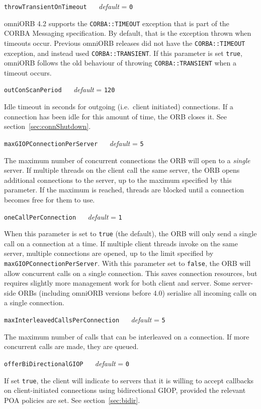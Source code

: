 \documentclass[11pt,twoside,a4paper]{book}
\makeatletter
\newcommand{\code}[1]{\texttt{#1}}
\newcommand{\confopt}[2]
  {\vspace{\baselineskip}\par\noindent\code{#1} ~~ \textit{default} =
   \code{#2}}
\renewcommand{\confopt}[2]
  {\vspace{\baselineskip}\par\noindent\code{#1} ~~ \textit{default} =
   \code{#2}\\[-1ex]\@afterheading}
\newcommand{\dsc}{\discretionary{}{}{}}
\makeatother
\begin{document}
\confopt{throwTransientOnTimeout}{0}

omniORB 4.2 supports the \code{CORBA::TIMEOUT} exception that is part
of the CORBA Messaging specification. By default, that is the
exception thrown when timeouts occur. Previous omniORB releases did
not have the \code{CORBA::TIMEOUT} exception, and instead used
\code{CORBA::TRANSIENT}. If this parameter is set \code{true}, omniORB
follows the old behaviour of throwing \code{CORBA::TRANSIENT} when a
timeout occurs.


\confopt{outConScanPeriod}{120}

Idle timeout in seconds for outgoing (i.e.\ client initiated)
connections. If a connection has been idle for this amount of time,
the ORB closes it. See section~\ref{sec:connShutdown}.


\confopt{maxGIOPConnectionPerServer}{5}

The maximum number of concurrent connections the ORB will open to a
\emph{single} server. If multiple threads on the client call the same
server, the ORB opens additional connections to the server, up to the
maximum specified by this parameter. If the maximum is reached,
threads are blocked until a connection becomes free for them to use.


\confopt{oneCallPerConnection}{1}

When this parameter is set to \code{true} (the default), the ORB will
only send a single call on a connection at a time. If multiple client
threads invoke on the same server, multiple connections are opened, up
to the limit specified by
\code{maxGIOP\dsc{}ConnectionPerServer}. With this parameter set to
\code{false}, the ORB will allow concurrent calls on a single
connection. This saves connection resources, but requires slightly
more management work for both client and server. Some server-side ORBs
(including omniORB versions before 4.0) serialise all incoming calls
on a single connection.

\confopt{maxInterleavedCallsPerConnection}{5}

The maximum number of calls that can be interleaved on a connection.
If more concurrent calls are made, they are queued.


\confopt{offerBiDirectionalGIOP}{0}

If set \code{true}, the client will indicate to servers that it is
willing to accept callbacks on client-initiated connections using
bidirectional GIOP, provided the relevant POA policies are set. See
section~\ref{sec:bidir}.
\end{document}
